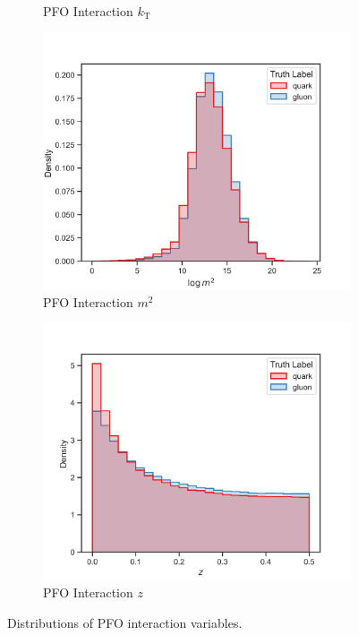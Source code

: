 \begin{figure}[!htb]
\begin{subfigure}[t]{0.49\textwidth}
        \caption{PFO Interaction $k_{\mathrm{T}}$}
        \label{fig:app_pfo_interaction_k_t}
    \end{subfigure}
    \begin{subfigure}[t]{0.49\textwidth}
        \includegraphics[width=\linewidth]{src/plots/distributions/int_PFOs/m2.png}
        \caption{PFO Interaction $m^2$}
        \label{fig:app_pfo_interaction_m2}
    \end{subfigure}
    \begin{subfigure}[t]{0.49\textwidth}
        \includegraphics[width=\linewidth]{src/plots/distributions/int_PFOs/z.png}
        \caption{PFO Interaction $z$}
        \label{fig:app_pfo_interaction_z}
    \end{subfigure}
\caption{Distributions of PFO interaction variables.}
\label{fig:app_pfo_interaction_variables}
\end{figure}

